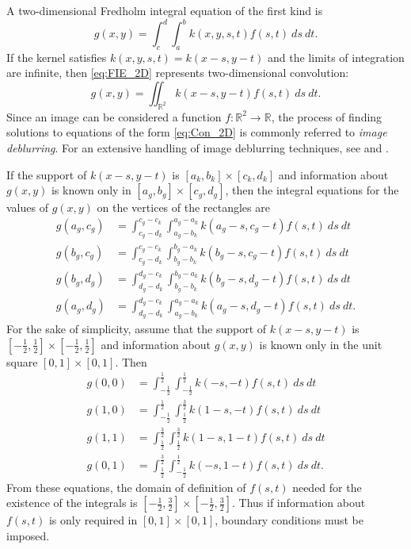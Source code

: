 A two-dimensional Fredholm integral equation of the first kind is
\begin{equation}
g(x,y) = \int_c^d \int_a^b k(x,y,s,t)f(s,t)~ds~dt.
\label{eq:FIE_2D}
\end{equation}
If the kernel satisfies $k(x,y,s,t) = k(x-s,y-t)$ and the limits of integration are infinite, then \eqref{eq:FIE_2D} represents two-dimensional convolution:
\begin{equation}
g(x,y) = \iint_{\mathbb{R}^2} k(x-s,y-t)f(s,t)~ds~dt.
\label{eq:Con_2D}
\end{equation}
Since an image can be considered a function $f : \mathbb{R}^2 \rightarrow \mathbb{R}$, the process of finding solutions to equations of the form \eqref{eq:Con_2D} is commonly referred to \textit{image deblurring}. For an extensive handling of image deblurring techniques, see \cite{HansenNagyOLeary} and \cite[Ch.~5]{Vogel:2002}. \par
If the support of $k(x-s,y-t)$ is $[a_k,b_k] \times [c_k,d_k]$ and information about $g(x,y)$ is known only in $[a_g,b_g] \times [c_g,d_g]$, then the integral equations for the values of $g(x,y)$ on the vertices of the rectangles are
\begin{align*}
g(a_g,c_g) &= \int_{c_g-d_k}^{c_g-c_k} \int_{a_g-b_k}^{a_g-a_k} k(a_g-s,c_g-t)f(s,t)~ds~dt \\
g(b_g,c_g) &= \int_{c_g-d_k}^{c_g-c_k} \int_{b_g-b_k}^{b_g-a_k} k(b_g-s,c_g-t)f(s,t)~ds~dt \\
g(b_g,d_g) &= \int_{d_g-d_k}^{d_g-c_k} \int_{b_g-b_k}^{b_g-a_k} k(b_g-s,d_g-t)f(s,t)~ds~dt \\
g(a_g,d_g) &= \int_{d_g-d_k}^{d_g-c_k} \int_{a_g-b_k}^{a_g-a_k} k(a_g-s,d_g-t)f(s,t)~ds~dt.
\end{align*}
For the sake of simplicity, assume that the support of $k(x-s,y-t)$ is $[-\frac{1}{2},\frac{1}{2}] \times [-\frac{1}{2},\frac{1}{2}]$ and information about $g(x,y)$ is known only in the unit square $[0,1] \times [0,1]$. Then
\begin{align*}
g(0,0) &= \int_{-\frac{1}{2}}^{\frac{1}{2}} \int_{-\frac{1}{2}}^{\frac{1}{2}} k(-s,-t)f(s,t)~ds~dt \\
g(1,0) &= \int_{-\frac{1}{2}}^{\frac{1}{2}} \int_{\frac{1}{2}}^{\frac{3}{2}} k(1-s,-t)f(s,t)~ds~dt \\
g(1,1) &= \int_{\frac{1}{2}}^{\frac{3}{2}} \int_{\frac{1}{2}}^{\frac{3}{2}} k(1-s,1-t)f(s,t)~ds~dt \\
g(0,1) &= \int_{\frac{1}{2}}^{\frac{3}{2}} \int_{-\frac{1}{2}}^{\frac{1}{2}} k(-s,1-t)f(s,t)~ds~dt.
\end{align*}
From these equations, the domain of definition of $f(s,t)$ needed for the existence of the integrals is $[-\frac{1}{2},\frac{3}{2}] \times [-\frac{1}{2},\frac{3}{2}]$. Thus if information about $f(s,t)$ is only required in $[0,1] \times [0,1]$, boundary conditions must be imposed.

